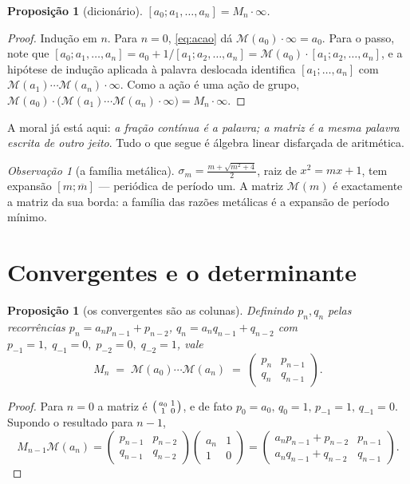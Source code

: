 \documentclass[11pt,a4paper]{article}
\theoremstyle{plain}
\newtheorem{proposicao}[teorema]{Proposição}
\theoremstyle{definition}
\theoremstyle{remark}
\newtheorem{obs}[teorema]{Observação}
\newcommand{\Mat}[1]{\mathcal{M}(#1)}
\newcommand{\cf}[2]{[#1;#2]}
\begin{document}
\begin{proposicao}[dicionário]\label{prop:dic}
$\cf{a_0}{a_1,\dots,a_n} = M_n \cdot \infty$.
\end{proposicao}

\begin{proof}
Indução em $n$. Para $n=0$, \eqref{eq:acao} dá $\Mat{a_0}\cdot\infty = a_0$.
Para o passo, note que $\cf{a_0}{a_1,\dots,a_n} = a_0 + 1/\cf{a_1}{a_2,\dots,a_n}
= \Mat{a_0}\cdot \cf{a_1}{a_2,\dots,a_n}$, e a hipótese de indução aplicada à palavra
deslocada identifica $\cf{a_1}{\dots,a_n}$ com $\Mat{a_1}\cdots\Mat{a_n}\cdot\infty$.
Como a ação é uma ação de grupo, $\Mat{a_0}\cdot\big(\Mat{a_1}\cdots\Mat{a_n}\cdot\infty\big)
= M_n\cdot\infty$.
\end{proof}

A moral já está aqui: \emph{a fração contínua é a palavra; a matriz é a mesma palavra escrita
de outro jeito}. Tudo o que segue é álgebra linear disfarçada de aritmética.

\begin{obs}[a família metálica]\label{obs:metais}
$\sigma_m = \tfrac{m+\sqrt{m^2+4}}{2}$, raiz de $x^2 = mx+1$, tem expansão $\cf{m}{\overline{m}}$ ---
periódica de período um. A matriz $\Mat{m}$ é exactamente a matriz da sua borda: a família das
razões metálicas é a expansão de período mínimo.
\end{obs}

\section{Convergentes e o determinante}\label{sec:conv}

\begin{proposicao}[os convergentes são as colunas]\label{prop:conv}
Definindo $p_n,q_n$ pelas recorrências
$p_n = a_np_{n-1}+p_{n-2}$, $q_n = a_nq_{n-1}+q_{n-2}$ com
$p_{-1}=1,\;q_{-1}=0,\;p_{-2}=0,\;q_{-2}=1$, vale
\[
  M_n \;=\; \Mat{a_0}\cdots\Mat{a_n} \;=\;
  \begin{pmatrix} p_n & p_{n-1} \\ q_n & q_{n-1} \end{pmatrix}.
\]
\end{proposicao}

\begin{proof}
Para $n=0$ a matriz é $\begin{psmallmatrix} a_0&1\\1&0\end{psmallmatrix}$, e de fato
$p_0=a_0,\,q_0=1,\,p_{-1}=1,\,q_{-1}=0$. Supondo o resultado para $n-1$,
\[
  M_{n-1}\Mat{a_n}
  = \begin{pmatrix} p_{n-1} & p_{n-2} \\ q_{n-1} & q_{n-2}\end{pmatrix}
    \begin{pmatrix} a_n & 1 \\ 1 & 0 \end{pmatrix}
  = \begin{pmatrix} a_np_{n-1}+p_{n-2} & p_{n-1} \\ a_nq_{n-1}+q_{n-2} & q_{n-1}\end{pmatrix}.
\]
\end{proof}
\end{document}
